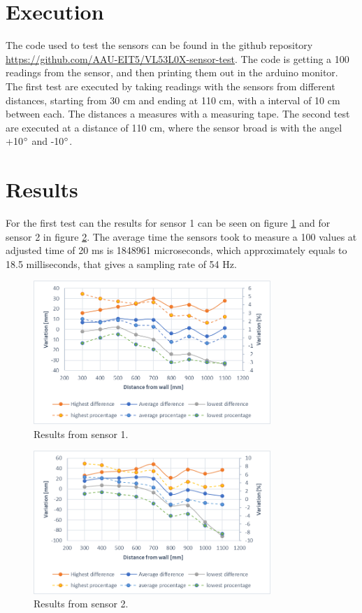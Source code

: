 %
\section*{Execution}
The code used to test the sensors can be found in the github repository \url{https://github.com/AAU-EIT5/VL53L0X-sensor-test}. The code is getting a 100 readings from the sensor, and then printing them out in the arduino monitor.
\newline
The first test are executed by taking readings with the sensors from different distances, starting from 30 cm and ending at 110 cm, with a interval of 10 cm between each. The distances a measures with a measuring tape.
\newline
The second test are executed at a distance of 110 cm, where the sensor broad is with the angel +10$\degree$ and -10$\degree$. 

%
\section*{Results}
For the first test can the results for sensor 1 can be seen on figure \ref{fig:resultatSensor1test} and for sensor 2 in figure \ref{fig:resultatSensor2test}. The average time the sensors took to measure a 100 values at adjusted time of 20 ms is 1848961 microseconds, which approximately equals to 18.5 milliseconds, that gives a sampling rate of 54 Hz. 

\begin{figure}[H]
    \centering
    \includegraphics[width=0.8\textwidth]{figures/Appendix/resultatSensor1Test.png}
    \caption{Results from sensor 1.}
    \label{fig:resultatSensor1test}
\end{figure}
\begin{figure}[H]
    \centering
    \includegraphics[width=0.8\textwidth]{figures/Appendix/resultatSensor2Test.png}
    \caption{Results from sensor 2.}
    \label{fig:resultatSensor2test}
\end{figure}

